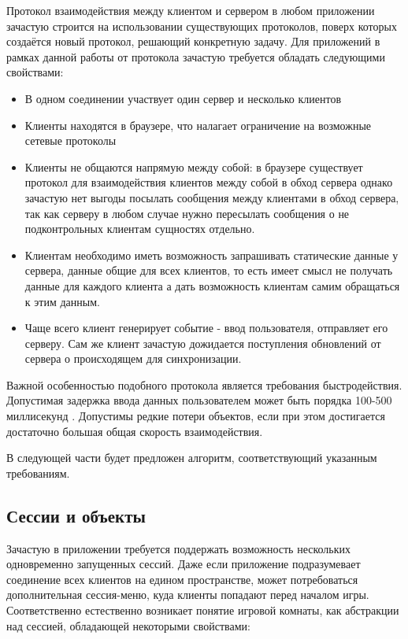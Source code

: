 \documentclass[a4paper,14pt, openany]{book}
\begin{document}
Протокол взаимодействия между клиентом и сервером в любом приложении зачастую строится на использовании существующих протоколов, поверх которых создаётся новый протокол, решающий конкретную задачу. Для приложений в рамках данной работы от протокола зачастую требуется обладать следующими свойствами:

\begin{itemize}
  \item В одном соединении участвует один сервер и несколько клиентов
  \item Клиенты находятся в браузере, что налагает ограничение на возможные сетевые протоколы
  \item Клиенты не общаются напрямую между собой: в браузере существует протокол для взаимодействия клиентов между собой в обход сервера \cite{webrtc} однако зачастую нет выгоды посылать сообщения между клиентами в обход сервера, так как серверу в любом случае нужно пересылать сообщения о не подконтрольных клиентам сущностях отдельно.
  \item Клиентам необходимо иметь возможность запрашивать статические данные у сервера, данные общие для всех клиентов, то есть имеет смысл не получать данные для каждого клиента а дать возможность клиентам самим обращаться к этим данным.
  \item Чаще всего клиент генерирует событие - ввод пользователя, отправляет его серверу. Сам же клиент зачастую дожидается поступления обновлений от сервера о происходящем для синхронизации.
\end{itemize}

Важной особенностью подобного протокола является требования быстродействия. Допустимая задержка ввода данных пользователем может быть порядка 100-500 миллисекунд \cite{latencyArticle}. Допустимы редкие потери объектов, если при этом достигается достаточно большая общая скорость взаимодействия.

В следующей части будет предложен алгоритм, соответствующий указанным требованиям. 

\subsection{Сессии и объекты}

Зачастую в приложении требуется поддержать возможность нескольких одновременно запущенных сессий. Даже если приложение подразумевает соединение всех клиентов на едином пространстве, может потребоваться дополнительная сессия-меню, куда клиенты попадают перед началом игры. Соответственно естественно возникает понятие игровой комнаты, как абстракции над сессией, обладающей некоторыми свойствами:
\end{document}
